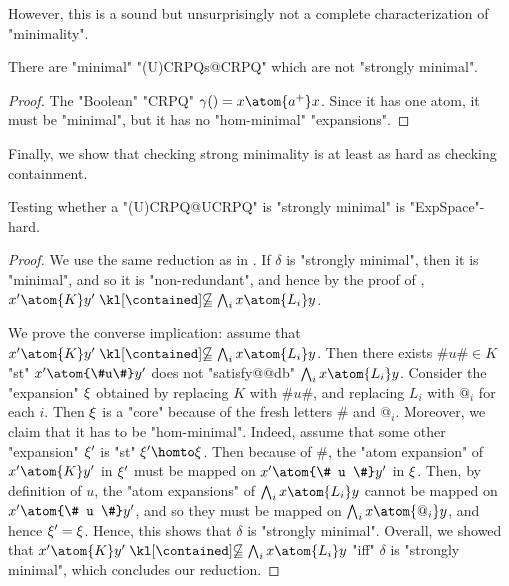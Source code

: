 However, this is a sound but unsurprisingly not a complete characterization of "minimality".

\begin{proposition}
	There are "minimal" "(U)CRPQs@CRPQ" which are not "strongly minimal". 
\end{proposition}

\begin{proof}
	The "Boolean" "CRPQ" $\gamma() = x \atom{a^+} x$. Since it has one atom, it must be "minimal", but it has no "hom-minimal" "expansions".
\end{proof}

Finally, we show that checking strong minimality is at least as hard as checking containment.

\begin{proposition}
	\AP\label{prop:lowerbound-strong-minimality}
	Testing whether a "(U)CRPQ@UCRPQ" is "strongly minimal" is "ExpSpace"-hard.
\end{proposition}

\begin{proof}
	We use the same reduction as in .
	If $\delta$ is "strongly minimal", then it is "minimal", and so it is
	"non-redundant", and hence
	by the proof of ,
	$x' \atom{K} y' \notcontained \bigwedge_i x \atom{L_i} y$.
	
	We prove the converse implication: assume that
		$x' \atom{K} y' \notcontained \bigwedge_i x \atom{L_i} y$.
	Then there exists $\#u\# \in K$ "st" $x' \atom{\#u\#} y'$
	does not "satisfy@@db" $\bigwedge_i x \atom{L_i} y$.
	Consider the "expansion" $\xi$ obtained by replacing $K$ with $\#u\#$, and replacing 
	$L_i$ with $@_i$ for each $i$.
	Then $\xi$ is a "core" because of the fresh letters $\#$ and $@_i$.
	Moreover, we claim that it has to be "hom-minimal".
	Indeed, assume that some other "expansion" $\xi'$ is "st" $\anexpansion'\homto \anexpansion$.
	Then because of $\#$, the "atom expansion" of $x' \atom{K} y'$ in $\xi'$ 
	must be mapped on $x' \atom{\# u \#} y'$ in $\xi$.
	Then, by definition of $u$, the "atom expansions" of $\bigwedge_i x \atom{L_i} y$
	cannot be mapped on $x' \atom{\# u \#} y'$, and so they must be mapped on
	$\bigwedge_i x \atom{@_i} y$, and hence $\xi' = \xi$.
	Hence, this shows that $\delta$ is "strongly minimal".
	Overall, we showed that $x' \atom{K} y' \notcontained \bigwedge_i x \atom{L_i} y$
	"iff" $\delta$ is "strongly minimal", which concludes our reduction.
\end{proof}
